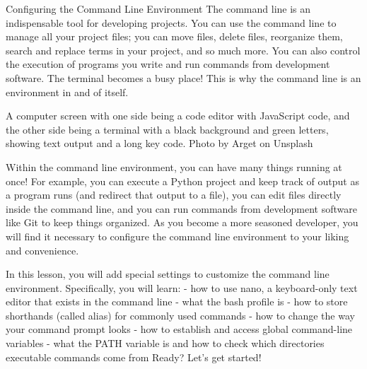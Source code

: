 Configuring the Command Line Environment
    The command line is an indispensable tool for developing projects. You can use the command line to manage all your project files; you can move files, delete files, reorganize them, search and replace terms in your project, and so much more. You can also control the execution of programs you write and run commands from development software. The terminal becomes a busy place! This is why the command line is an environment in and of itself.

    A computer screen with one side being a code editor with JavaScript code, and the other side being a terminal with a black background and green letters, showing text output and a long key code.
    Photo by Arget on Unsplash

    Within the command line environment, you can have many things running at once! For example, you can execute a Python project and keep track of output as a program runs (and redirect that output to a file), you can edit files directly inside the command line, and you can run commands from development software like Git to keep things organized. As you become a more seasoned developer, you will find it necessary to configure the command line environment to your liking and convenience.

    In this lesson, you will add special settings to customize the command line environment. Specifically, you will learn:
        - how to use nano, a keyboard-only text editor that exists in the command line
        - what the bash profile is
        - how to store shorthands (called alias) for commonly used commands
        - how to change the way your command prompt looks
        - how to establish and access global command-line variables
        - what the PATH variable is and how to check which directories executable commands come from
    Ready? Let’s get started!